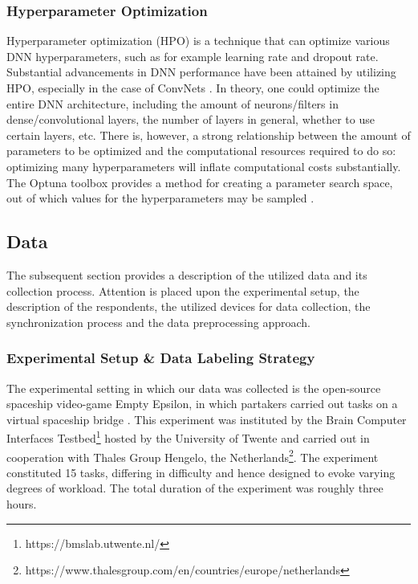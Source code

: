 \documentclass[fleqn,11pt]{paper}
\begin{document}
\subsubsection*{Hyperparameter Optimization}
Hyperparameter optimization (HPO) is a technique that can optimize various DNN hyperparameters, such as for example learning rate and dropout rate. Substantial advancements in DNN performance have been attained by utilizing HPO, especially in the case of ConvNets \cite{bergstra2012random}. In theory, one could optimize the entire DNN architecture, including the amount of neurons/filters in dense/convolutional layers, the number of layers in general, whether to use certain layers, etc. There is, however, a strong relationship between the amount of parameters to be optimized and the computational resources required to do so: optimizing many hyperparameters will inflate computational costs substantially. The Optuna toolbox provides a method for creating a parameter search space, out of which values for the hyperparameters may be sampled \cite{akiba2019optuna}. 

\subsection{Data} \label{sec:data}
The subsequent section provides a description of the utilized data and its collection process. Attention is placed upon the experimental setup, the description of the respondents, the utilized devices for data collection, the synchronization process and the data preprocessing approach. 

\subsubsection*{Experimental Setup \& Data Labeling Strategy}
The experimental setting in which our data was collected is the open-source spaceship video-game Empty Epsilon, in which partakers carried out tasks on a virtual spaceship bridge \cite{daid2016empty}. This experiment was instituted by the Brain Computer Interfaces Testbed\footnote{https://bmslab.utwente.nl/} hosted by the University of Twente and carried out in cooperation with Thales Group Hengelo, the Netherlands\footnote{https://www.thalesgroup.com/en/countries/europe/netherlands}. The experiment constituted 15 tasks, differing in difficulty and hence designed to evoke varying degrees of workload. The total duration of the experiment was roughly three hours.  
\end{document}
